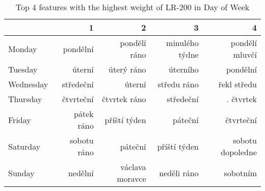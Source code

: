 \begin{table}
    \centering\footnotesize\sf
    \begin{tabular}{lrrrr}
        \toprule
        {} &            1 &                2 &               3 &                 4 \\
        \midrule
        Monday    &     pondělní &     pondělí ráno &  minulého týdne &    pondělí mluvčí \\
        Tuesday   &       úterní &       úterý ráno &        úterního &          pondělní \\
        Wednesday &    středeční &           úterní &     středu ráno &       řekl středu \\
        Thursday  &    čtvrteční &     čtvrtek ráno &       středeční &         . čtvrtek \\
        Friday    &   pátek ráno &     příští týden &         páteční &         čtvrteční \\
        Saturday  &  sobotu ráno &          páteční &    příští týden &  sobotu dopoledne \\
        Sunday    &      nedělní &  václava moravce &     neděli ráno &          sobotním \\
        \bottomrule
    \end{tabular}
    \caption{Top 4 features with the highest weight of LR-200 in Day of Week}
    \label{tab:top4_day_of_week}
\end{table}
